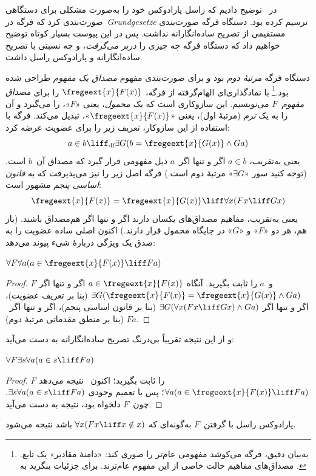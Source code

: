 \documentclass[../../../include/open-logic-section]{subfiles}
\begin{document}


در~ توضیح دادیم که راسل پارادوکس خود را به‌صورت مشکلی
برای دستگاهی صورت‌بندی کرد که فرگه در~\emph{Grundgesetze} ترسیم کرده بود.
دستگاه فرگه صورت‌بندی مستقیمی از تصریح ساده‌انگارانه نداشت. پس در این
پیوست بسیار کوتاه توضیح خواهیم داد که دستگاه فرگه چه چیزی را
\emph{دربر می‌گرفت}، و چه نسبتی با تصریح ساده‌انگارانه و پارادوکس راسل
داشت.

دستگاه فرگه \emph{مرتبهٔ دوم} بود و برای صورت‌بندی مفهوم
\emph{مصداق یک مفهوم} طراحی شده بود.\footnote{به‌بیان دقیق، فرگه می‌کوشد
مفهومی عام‌تر را صوری کند: «دامنهٔ مقادیر» یک تابع. مصداق‌های مفاهیم حالت
خاصی از این مفهوم عام‌ترند. برای جزئیات بنگرید به
\citet[pp.\ 8--9]{Heck2012}.} با نمادگذاری‌ای الهام‌گرفته از فرگه،
$\fregeext{x}{F(x)}$ را برای \emph{مصداق مفهوم~$F$} می‌نویسیم. این
سازوکاری است که یک \emph{محمول}، یعنی «$F$»، را می‌گیرد و آن را به یک
\emph{ترم} (مرتبهٔ اول)، یعنی «$\fregeext{x}{F(x)}$»، تبدیل می‌کند. فرگه
با استفاده از این سازوکار، تعریف زیر را برای عضویت عرضه کرد:
\[
	a \in b \liff_{\text{df}} \exists G(b = \fregeext{x}{G(x)} \land Ga)
\]
یعنی به‌تقریب، $a \in b$ اگر و تنها اگر~$a$ ذیل مفهومی قرار گیرد که
مصداق آن~$b$ است. (توجه کنید سور «$\exists G$» مرتبهٔ دوم است.) فرگه اصل
زیر را نیز می‌پذیرفت که به \emph{قانون اساسی پنجم} مشهور است:
$$\fregeext{x}{F(x)} = \fregeext{x}{G(x)} \liff \forall x (Fx \liff Gx)$$
یعنی به‌تقریب، مفاهیم مصداق‌های یکسان دارند اگر و تنها اگر هم‌مصداق باشند.
(باز هم، هر دو «$F$» و «$G$» در جایگاه محمول قرار دارند.) اکنون اصلی ساده
عضویت را به صدق یک ویژگی دربارهٔ شیء پیوند می‌دهد:

\begin{lem}
$\forall F \forall a(a \in \fregeext{x}{F(x)} \liff Fa)$
\end{lem}

\begin{proof}
$F$ و~$a$ را ثابت بگیرید. آنگاه
$a \in \fregeext{x}{F(x)}$ اگر و تنها اگر
$\exists G(\fregeext{x}{F(x)} = \fregeext{x}{G(x)} \land Ga)$
(بنا بر تعریف عضویت)، اگر و تنها اگر
$\exists G(\forall x(Fx \liff Gx) \land Ga)$
(بنا بر قانون اساسی پنجم)، اگر و تنها اگر~$Fa$ (بنا بر منطق مقدماتی
مرتبهٔ دوم).
\end{proof}

و از این نتیجه تقریباً بی‌درنگ تصریح ساده‌انگارانه به دست می‌آید:

\begin{lem}
$\forall F \exists s \forall a (a \in s \liff Fa)$
\end{lem}

\begin{proof}
$F$ را ثابت بگیرید؛ اکنون~ نتیجه می‌دهد
$\forall a (a \in \fregeext{x}{F(x)} \liff Fa)$؛ پس با تعمیم وجودی
$\exists s\forall a(a \in s \liff Fa)$. چون~$F$ دلخواه بود، نتیجه به
دست می‌آید.
\end{proof}

پارادوکس راسل با گرفتن~$F$ به‌گونه‌ای که
$\forall x(Fx \liff x \notin x)$ باشد نتیجه می‌شود.
\end{document}
